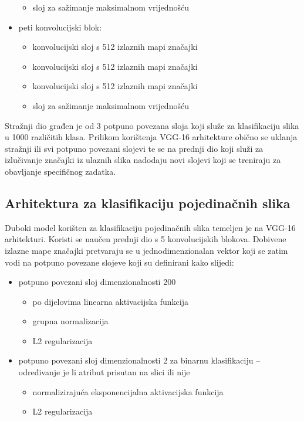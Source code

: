 \documentclass[times, utf8, diplomski, numeric]{fer}
\begin{document}
\begin{itemize}
\begin{itemize}
  \item sloj za sažimanje maksimalnom vrijednošću
 \end{itemize}
     \item peti konvolucijski blok:
 \begin{itemize}
  \item konvolucijski sloj s 512 izlaznih mapi značajki
  \item konvolucijski sloj s 512 izlaznih mapi značajki
  \item konvolucijski sloj s 512 izlaznih mapi značajki
  \item sloj za sažimanje maksimalnom vrijednošću
 \end{itemize}
\end{itemize}

Stražnji dio građen je od  3 potpuno povezana sloja koji služe za klasifikaciju slika u 1000 različitih klasa. 
Prilikom korištenja VGG-16 arhitekture obično se uklanja stražnji ili svi potpuno povezani slojevi te se na prednji dio koji služi za izlučivanje značajki iz ulaznih slika nadodaju novi slojevi koji se treniraju za obavljanje specifičnog zadatka.

\subsection{Arhitektura za klasifikaciju pojedinačnih slika}
Duboki model korišten za klasifikaciju pojedinačnih slika temeljen je na VGG-16 arhitekturi. 
Koristi se naučen prednji dio s 5 konvolucijskih blokova. 
Dobivene izlazne mape značajki pretvaraju se u jednodimenzionalan vektor koji se zatim vodi na potpuno povezane slojeve koji su definirani kako slijedi:
\begin{itemize}
 \item potpuno povezani sloj dimenzionalnosti 200
 \begin{itemize}
  \item po dijelovima linearna  aktivacijska funkcija
  \item grupna normalizacija 
  \item L2 regularizacija
 \end{itemize}
 \item potpuno povezani sloj dimenzionalnosti 2 za binarnu klasifikaciju -- određivanje je li atribut prisutan na slici ili nije
 \begin{itemize}
  \item normalizirajuća eksponencijalna  aktivacijska funkcija
  \item L2 regularizacija
 \end{itemize}
\end{itemize}
\end{document}
